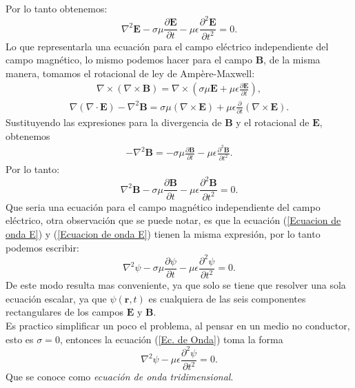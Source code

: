 \documentclass[11pt,fleqn]{book} %
\begin{document}
Por lo  tanto obtenemos:
\begin{equation}
\nabla^{2}\textbf{E}-\sigma\mu\frac{\partial \textbf{E}}{\partial t}-\mu\epsilon\frac{\partial^{2} \textbf{E}}{\partial t^{2}}=0.  \label{Ecuacion de onda E}
\end{equation}
Lo que representarla una ecuaci\'on para el campo el\'ectrico independiente del campo magn\'etico, lo mismo podemos hacer para el campo $\textbf{B}$, de la misma manera, tomamos el rotacional de ley de Ampère-Maxwell:
\begin{eqnarray*}
\nabla\times(\nabla\times\textbf{B})=\nabla\times\left( \sigma\mu\textbf{E}+\mu\epsilon\frac{\partial \textbf{E}}{\partial t} \right),
\end{eqnarray*}
\begin{eqnarray*}
\nabla(\nabla\cdot\textbf{E})-\nabla^{2}\textbf{B}=\sigma\mu(\nabla\times\textbf{E})+\mu\epsilon\frac{\partial }{\partial t}(\nabla\times\textbf{E}).
\end{eqnarray*}
Sustituyendo las expresiones para la divergencia de $\textbf{B}$ y el rotacional de $\textbf{E}$, obtenemos
\begin{eqnarray*}
-\nabla^{2}\textbf{B}=-\sigma\mu\frac{\partial \textbf{B}}{\partial t}-\mu\epsilon\frac{\partial^{2} \textbf{B} }{\partial t^{2}}.
\end{eqnarray*}
Por lo tanto:
\begin{equation}
\nabla^{2}\textbf{B}-\sigma\mu\frac{\partial \textbf{B}}{\partial t}-\mu\epsilon\frac{\partial^{2} \textbf{B} }{\partial t^{2}}=0.  \label{Ecuacion de onda B}
\end{equation}
Que seria una ecuaci\'on para el campo magn\'etico independiente del campo el\'ectrico, otra observaci\'on que se puede notar, es que la ecuaci\'on (\ref{Ecuacion de onda E}) y (\ref{Ecuacion de onda E}) tienen la misma expresi\'on, por lo tanto podemos escribir:
\begin{equation}
\nabla^{2}\psi-\sigma\mu\frac{\partial \psi}{\partial t}-\mu\epsilon\frac{\partial^{2} \psi }{\partial t^{2}}=0. \label{Ec. de Onda}
\end{equation}
De este modo resulta mas conveniente, ya que solo se tiene que resolver una sola ecuaci\'on escalar, ya que $\psi(\textbf{r},t)$ es cualquiera de las seis componentes rectangulares de los campos $\textbf{E}$ y $\textbf{B}$.\\
Es practico simplificar un poco el problema, al pensar en un medio no conductor, esto es $\sigma=0$, entonces la ecuaci\'on (\ref{Ec. de Onda}) toma la forma
\begin{equation}
\nabla^{2}\psi-\mu\epsilon\frac{\partial^{2} \psi }{\partial t^{2}}=0.  \label{Ec. de Onda Vacio}
\end{equation}
Que se conoce como \textit{ecuaci\'on de onda tridimensional}. \cite{Milford1986}
\end{document}
